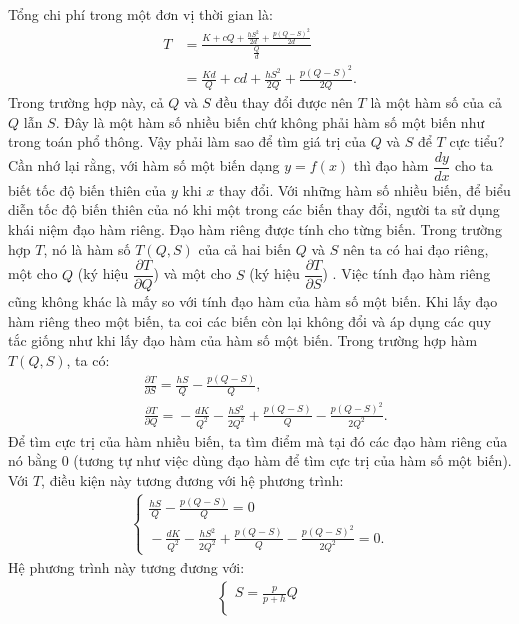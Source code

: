 \begin{multicols}{2}
	Tổng chi phí trong một đơn vị thời gian là:
	\begin{align*}
		T &= \frac{K + cQ + \frac{hS^2}{2d} + \frac{p(Q-S)^2}{2d}}{\frac{Q}{d}}\\
		 &= \frac{Kd}{Q} + cd + \frac{hS^2}{2Q} + \frac{p(Q-S)^2}{2Q}.
	\end{align*}
	Trong trường hợp này, cả $Q$ và $S$ đều thay đổi được nên $T$ là một hàm số của cả $Q$ lẫn $S$. Đây là một hàm số nhiều biến chứ không phải hàm số một biến như trong toán phổ thông. Vậy phải làm sao để tìm giá trị của $Q$ và $S$ để $T$ cực tiểu?
	\vskip 0.1cm
	Cần nhớ lại rằng, với hàm số một biến dạng $y=f(x)$ thì đạo hàm $\dfrac{dy}{dx}$ cho ta biết tốc độ biến thiên của $y$ khi $x$ thay đổi. Với những hàm số nhiều biến, để biểu diễn tốc độ biến thiên của nó khi một trong các biến thay đổi, người ta sử dụng khái niệm đạo hàm riêng. Đạo hàm riêng được tính cho từng biến. Trong trường hợp $T$, nó là hàm số $T(Q,S)$ của cả hai biến $Q$ và $S$ nên ta có hai đạo riêng, một cho $Q$ (ký hiệu $\dfrac{\partial T}{\partial Q}$) và một cho $S$ (ký hiệu $\dfrac{\partial T}{\partial S}$) . Việc tính đạo hàm riêng cũng không khác là mấy so với tính đạo hàm của hàm số một biến. Khi lấy đạo hàm riêng theo một biến, ta coi các biến còn lại không đổi và áp dụng các quy tắc giống như khi lấy đạo hàm của hàm số một biến.
	\vskip 0.1cm
	Trong trường hợp hàm $T(Q,S)$, ta có:
	\begin{align*}
		&\frac{\partial T}{\partial S} = \frac{hS}{Q} - \frac{p(Q-S)}{Q},\\
		&\frac{\partial T}{\partial Q} = \!- \frac{dK}{Q^2} \!-\! \frac{hS^2}{2Q^2} \!+\! \frac{p(Q\!-\!S)}{Q} \!-\! \frac{p(Q\!-\!S)^2}{2Q^2}.
	\end{align*}
	Để tìm cực trị của hàm nhiều biến, ta tìm điểm mà tại đó các đạo hàm riêng của nó bằng $0$ (tương tự như việc dùng đạo hàm để tìm cực trị của hàm số một biến). Với $T$, điều kiện này tương đương với hệ phương trình:
	\begin{align*}
		\begin{cases}
			\frac{hS}{Q} - \frac{p(Q-S)}{Q}= 0\\
			\!-\!\frac{dK}{Q^2} \!-\! \frac{hS^2}{2Q^2} \!+\! \frac{p(Q\!-\!S)}{Q} \!-\! \frac{p(Q\!-\!S)^2}{2Q^2}\!=\! 0.
		\end{cases}
	\end{align*}
	Hệ phương trình này tương đương với:
	\begin{align*}
		\begin{cases}
			S = \frac{p}{p+h}Q\\

\end{cases}
\end{align*}
\end{multicols}
